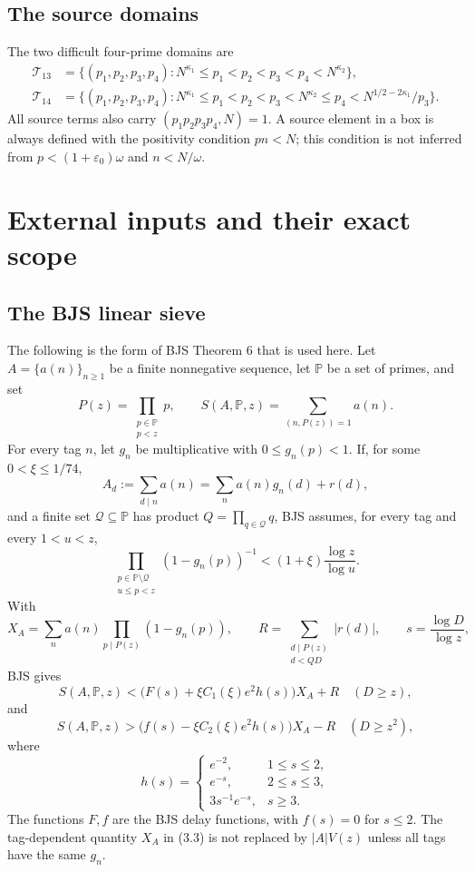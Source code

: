 \documentclass[11pt]{article}
\theoremstyle{definition}
\newcommand{\eps}{\varepsilon}
\begin{document}
\subsection{The source domains}
\label{sec:domains}

The two difficult four-prime domains are
\[
\begin{aligned}
 \mathscr T_{13}&=\{(p_1,p_2,p_3,p_4):
 N^{\kappa_1}\le p_1<p_2<p_3<p_4<N^{\kappa_2}\},\\
 \mathscr T_{14}&=\{(p_1,p_2,p_3,p_4):
 N^{\kappa_1}\le p_1<p_2<p_3<N^{\kappa_2}\le p_4
 <N^{1/2-2\kappa_1}/p_3\}.
\end{aligned}
\tag{2.7}
\]
All source terms also carry \((p_1p_2p_3p_4,N)=1\).  A source element
in a box is always defined with the positivity condition \(pn<N\); this
condition is not inferred from \(p<(1+\eps_0)\omega\) and \(n<N/\omega\).

\section{External inputs and their exact scope}
\label{sec:external-inputs}

\subsection{The BJS linear sieve}
\label{sec:bjs-linear}

The following is the form of BJS Theorem 6 that is used here.  Let
\(A=\{a(n)\}_{n\ge1}\) be a finite nonnegative sequence, let
\(\mathbb P\) be a set of primes, and set
\[
 P(z)=\prod_{\substack{p\in\mathbb P\\p<z}}p,\qquad
 S(A,\mathbb P,z)=\sum_{(n,P(z))=1}a(n).
\]
For every tag \(n\), let \(g_n\) be multiplicative with
\(0\le g_n(p)<1\).  If, for some \(0<\xi\le1/74\),
\[
 A_d:=\sum_{d\mid n}a(n)
 =\sum_n a(n)g_n(d)+r(d),
\tag{3.1}
\]
and a finite set \(\mathscr Q\subseteq\mathbb P\) has product
\(Q=\prod_{q\in\mathscr Q}q\), BJS assumes, for every tag
and every \(1<u<z\),
\[
 \prod_{\substack{p\in\mathbb P\setminus\mathscr Q\\u\le p<z}}
 (1-g_n(p))^{-1}
 <(1+\xi)\frac{\log z}{\log u}.
\tag{3.2}
\]
With
\[
 X_A=\sum_n a(n)\prod_{p\mid P(z)}(1-g_n(p)),\qquad
 R=\sum_{\substack{d\mid P(z)\\d<QD}}|r(d)|,\qquad
 s=\frac{\log D}{\log z},
\tag{3.3}
\]
BJS gives
\[
 S(A,\mathbb P,z)
 <\bigl(F(s)+\xi C_1(\xi)e^2h(s)\bigr)X_A+R
\quad(D\ge z),
\tag{3.4}
\]
and
\[
 S(A,\mathbb P,z)
 >\bigl(f(s)-\xi C_2(\xi)e^2h(s)\bigr)X_A-R
\quad(D\ge z^2),
\tag{3.5}
\]
where
\[
 h(s)=
 \begin{cases}
 e^{-2},&1\le s\le2,\\
 e^{-s},&2\le s\le3,\\
 3s^{-1}e^{-s},&s\ge3.
 \end{cases}
\tag{3.6}
\]
The functions \(F,f\) are the BJS delay functions, with \(f(s)=0\) for
\(s\le2\).  The tag-dependent quantity \(X_A\) in (3.3) is not replaced by
\(|A|V(z)\) unless all tags have the same \(g_n\).
\end{document}
